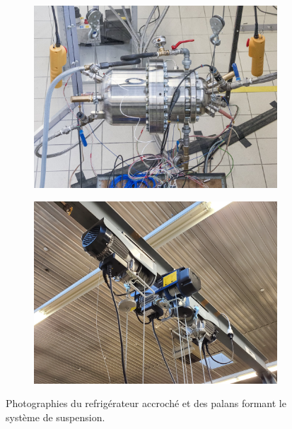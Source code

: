 \begin{figure}[!ht]
    \centering
	\begin{subfigure}{.47\textwidth}
		\centering
		\includegraphics[width=\textwidth]{../fig/fig_SystemeAccroche/Machine_horizBetter_cropped.jpg}
		\caption{}
		\label{fig:TACOTSuspendu_Frigo}
	\end{subfigure}		%
	\begin{subfigure}{.47\textwidth}
		\centering
		\includegraphics[width=\textwidth]{../fig/fig_SystemeAccroche/Palans.jpg}
		\caption{}
		\label{fig:TACOTSuspendu_Palans}
	\end{subfigure}	    
    \caption{Photographies  du refrigérateur accroché et  des palans formant le système de suspension.}
    \label{fig:TACOTSuspendu}
\end{figure}


